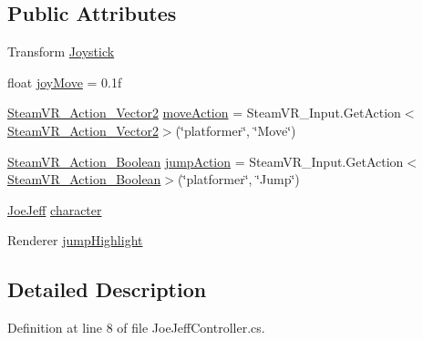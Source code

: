 \subsection*{Public Attributes}
\begin{DoxyCompactItemize}
\item 
Transform \mbox{\hyperlink{class_valve_1_1_v_r_1_1_interaction_system_1_1_sample_1_1_joe_jeff_controller_a911845c3c18b29b6260d495a5ad7dedd}{Joystick}}
\item 
float \mbox{\hyperlink{class_valve_1_1_v_r_1_1_interaction_system_1_1_sample_1_1_joe_jeff_controller_a12dab2d9932d42ad0983aceda2f77715}{joy\+Move}} = 0.\+1f
\item 
\mbox{\hyperlink{class_valve_1_1_v_r_1_1_steam_v_r___action___vector2}{Steam\+V\+R\+\_\+\+Action\+\_\+\+Vector2}} \mbox{\hyperlink{class_valve_1_1_v_r_1_1_interaction_system_1_1_sample_1_1_joe_jeff_controller_a34bb846e7157ea3e272f8b5bd46fc106}{move\+Action}} = Steam\+V\+R\+\_\+\+Input.\+Get\+Action$<$\mbox{\hyperlink{class_valve_1_1_v_r_1_1_steam_v_r___action___vector2}{Steam\+V\+R\+\_\+\+Action\+\_\+\+Vector2}}$>$(\char`\"{}platformer\char`\"{}, \char`\"{}Move\char`\"{})
\item 
\mbox{\hyperlink{class_valve_1_1_v_r_1_1_steam_v_r___action___boolean}{Steam\+V\+R\+\_\+\+Action\+\_\+\+Boolean}} \mbox{\hyperlink{class_valve_1_1_v_r_1_1_interaction_system_1_1_sample_1_1_joe_jeff_controller_a0491fc5948c9f9a3d86f664b532feee7}{jump\+Action}} = Steam\+V\+R\+\_\+\+Input.\+Get\+Action$<$\mbox{\hyperlink{class_valve_1_1_v_r_1_1_steam_v_r___action___boolean}{Steam\+V\+R\+\_\+\+Action\+\_\+\+Boolean}}$>$(\char`\"{}platformer\char`\"{}, \char`\"{}Jump\char`\"{})
\item 
\mbox{\hyperlink{class_valve_1_1_v_r_1_1_interaction_system_1_1_sample_1_1_joe_jeff}{Joe\+Jeff}} \mbox{\hyperlink{class_valve_1_1_v_r_1_1_interaction_system_1_1_sample_1_1_joe_jeff_controller_a8ace4b4cb2beaeb48648896964a01423}{character}}
\item 
Renderer \mbox{\hyperlink{class_valve_1_1_v_r_1_1_interaction_system_1_1_sample_1_1_joe_jeff_controller_ac03beab98ee7c1e3e1522f2f696e4c34}{jump\+Highlight}}
\end{DoxyCompactItemize}


\subsection{Detailed Description}


Definition at line 8 of file Joe\+Jeff\+Controller.\+cs.



